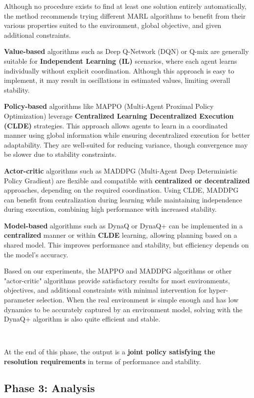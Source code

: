 \documentclass[sigconf,anonymous]{aamas}
\begin{document}
Although no procedure exists to find at least one solution entirely automatically, the method recommends trying different MARL algorithms to benefit from their various properties suited to the environment, global objective, and given additional constraints.

\textbf{Value-based} algorithms such as Deep Q-Network (DQN) or Q-mix are generally suitable for \textbf{Independent Learning (IL)} scenarios, where each agent learns individually without explicit coordination. Although this approach is easy to implement, it may result in oscillations in estimated values, limiting overall stability.

\textbf{Policy-based} algorithms like MAPPO (Multi-Agent Proximal Policy Optimization) leverage \textbf{Centralized Learning Decentralized Execution (CLDE)} strategies. This approach allows agents to learn in a coordinated manner using global information while ensuring decentralized execution for better adaptability. They are well-suited for reducing variance, though convergence may be slower due to stability constraints.

\textbf{Actor-critic} algorithms such as MADDPG (Multi-Agent Deep Deterministic Policy Gradient) are flexible and compatible with \textbf{centralized or decentralized} approaches, depending on the required coordination. Using CLDE, MADDPG can benefit from centralization during learning while maintaining independence during execution, combining high performance with increased stability.

\textbf{Model-based} algorithms such as DynaQ or DynaQ+ can be implemented in a \textbf{centralized} manner or within \textbf{CLDE} learning, allowing planning based on a shared model. This improves performance and stability, but efficiency depends on the model's accuracy.

Based on our experiments, the MAPPO and MADDPG algorithms or other "actor-critic" algorithms provide satisfactory results for most environments, objectives, and additional constraints with minimal intervention for hyper-parameter selection. When the real environment is simple enough and has low dynamics to be accurately captured by an environment model, solving with the DynaQ+ algorithm is also quite efficient and stable.

\

At the end of this phase, the output is a \textbf{joint policy satisfying the resolution requirements} in terms of performance and stability.

\subsection{Phase 3: Analysis}
\end{document}
